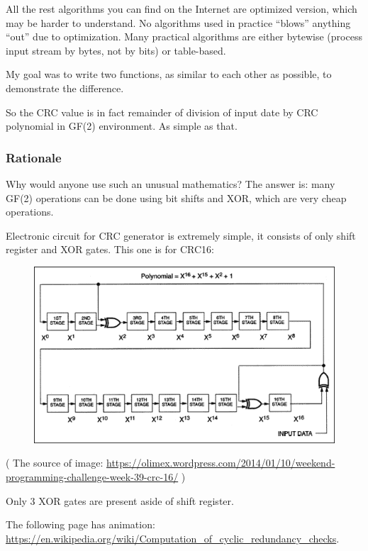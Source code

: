 All the rest algorithms you can find on the Internet are optimized version, which may be harder to understand.
No algorithms used in practice ``blows'' anything ``out'' due to optimization.
Many practical algorithms are either bytewise (process input stream by bytes, not by bits) or table-based.

My goal was to write two functions, as similar to each other as possible, to demonstrate the difference.

So the CRC value is in fact remainder of division of input date by CRC polynomial in GF(2) environment.
As simple as that.

\subsubsection{Rationale}

Why would anyone use such an unusual mathematics?
The answer is: many GF(2) operations can be done using bit shifts and XOR, which are very cheap operations.

Electronic circuit for CRC generator is extremely simple, it consists of only shift register and XOR gates.
This one is for CRC16:

\begin{figure}[H]
\centering
\includegraphics[scale=1]{CRC/explanation/CRC16.png}
\caption{}
\end{figure}

( The source of image: \url{https://olimex.wordpress.com/2014/01/10/weekend-programming-challenge-week-39-crc-16/} )

Only 3 XOR gates are present aside of shift register.

The following page has animation: \url{https://en.wikipedia.org/wiki/Computation_of_cyclic_redundancy_checks}.


